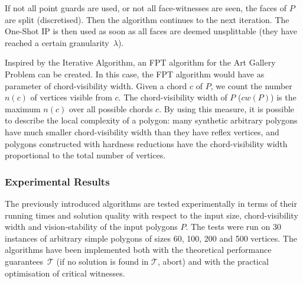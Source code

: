 If not all point guards are used, or not all face-witnesses are seen, the faces of $P$ are split (discretised). Then the algorithm continues to the next iteration. The One-Shot IP is then used as soon as all faces are deemed unsplittable (they have reached a certain granularity~$\lambda$). 



Inspired by the Iterative Algorithm, an FPT algorithm for the Art Gallery Problem can be created. In this case, the FPT algorithm would have as parameter of chord-visibility width. Given a chord $c$ of $P$, we count the number $n(c)$ of vertices visible from $c$. The chord-visibility width of $P$ ($cw(P)$)  is the maximum $n(c)$ over all possible chords $c$. By using this measure, it is possible to describe the local complexity of a polygon: many synthetic arbitrary polygons have much smaller chord-visibility width than they have reflex vertices, and polygons constructed with hardness reductions have the chord-visibility width proportional to the total number of vertices. 

\subsubsection{Experimental Results}
The previously introduced algorithms are tested experimentally in terms of their running times and solution quality with respect to the input size, chord-visibility width and vision-stability of the input polygons $P$. The tests were run on 30 instances of arbitrary simple polygons of sizes 60, 100, 200 and 500 vertices. The algorithms have been implemented both with the theoretical performance guarantees~$\mathcal T$ (if no solution is found in $\mathcal T$, abort) and with the practical optimisation of critical witnesses.

